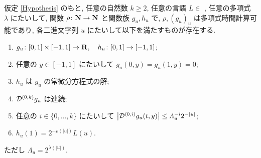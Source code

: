  \begin{lemma}
  \label{KTimesFamily}
  仮定 \ref{Hypothesis} のもと, 任意の自然数 $k \ge 2$,
  任意の言語 $L \in$ \PSPACE, 任意の多項式 $\lambda$ にたいして,
  関数 $\rho \colon \mathbf N \to \mathbf N$ と関数族 $g_u, h_u$ で,
  $\rho, (g_u)_u$ は多項式時間計算可能であり,
  各二進文字列 $u$ にたいして以下を満たすものが存在する.
  \begin{enumerate}
   \item $g_u\colon [0,1] \times [-1,1]\to \mathbf R, \quad h_u\colon [0,1] \to [-1,1]$;
   \item 任意の $y \in [-1,1]$ にたいして $g_u(0,y) = g_u(1,y) = 0 $;
   \item $h_u$ は $g_u$ の常微分方程式の解;
   \item $\mathcal D^{(0,k)} g_u$ は連続;
   \item 任意の $i \in \{0, \dots, k\}$ にたいして
	 $\left|\mathcal D^{(0,i)} g_u(t,y)\right| 
		\le \varLambda_u^{-i}2^{-|u|}$;
	 \label{enum:lem:differentiable}
   \item $h_u(1) = 2^{-\rho(|u|)}L(u)$.
  \end{enumerate}
  ただし $\Lambda_u = 2^{\lambda(|u|)}$.
 \end{lemma}
 
